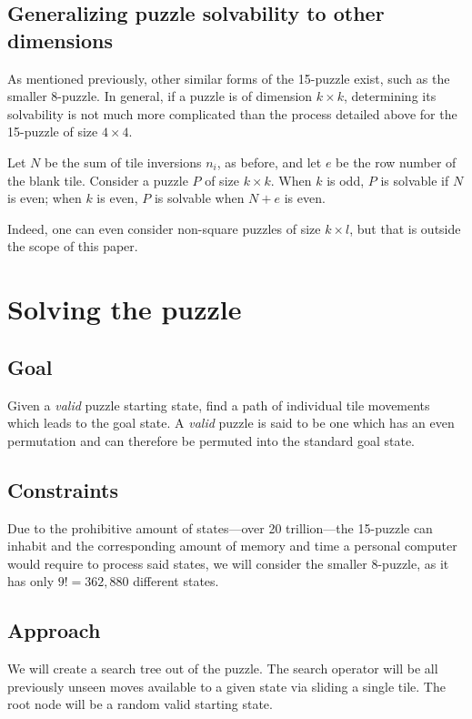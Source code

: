 \documentclass{article}
\begin{document}
  \subsection*{Generalizing puzzle solvability to other dimensions}
    As mentioned previously, other similar forms of the 15-puzzle exist, such as
    the smaller 8-puzzle. In general, if a puzzle is of dimension $k\times k$,
    determining its solvability is not much more complicated than the process
    detailed above for the 15-puzzle of size $4\times 4$.

    Let $N$ be the sum of tile inversions $n_i$, as before, and let $e$ be the
    row number of the blank tile. Consider a puzzle $P$ of size $k\times k$.
    When $k$ is odd, $P$ is solvable if $N$ is even; when $k$ is even, $P$ is
    solvable when $N+e$ is even.

    Indeed, one can even consider non-square puzzles of size $k\times l$, but
    that is outside the scope of this paper.

\section*{Solving the puzzle}
  \subsection*{Goal}
    Given a \textit{valid} puzzle starting state, find a path of individual tile
    movements which leads to the goal state. A \textit{valid} puzzle is said to
    be one which has an even permutation and can therefore be permuted into
    the standard goal state.

  \subsection*{Constraints}
    Due to the prohibitive amount of states---over 20 trillion---the 15-puzzle
    can inhabit and the corresponding amount of memory and time a personal
    computer would require to process said states, we will consider the smaller
    8-puzzle, as it has only $9!=362,880$ different states.

  \subsection*{Approach}
    We will create a search tree out of the puzzle. The search operator will
    be all previously unseen moves available to a given state via sliding a
    single tile. The root node will be a random valid starting state.
\end{document}
